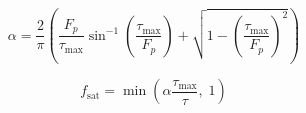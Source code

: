 \begin{equation}
\alpha = \frac{2}{\pi}\left( \frac{F_p}{\tau_{\max}}\sin^{-1}\left(\frac{\tau_{\max}}{F_p}\right) + \sqrt{1-\left(\frac{\tau_{\max}}{F_p}\right)^2} \right)
\end{equation}

\begin{equation}
f_{\mathrm{sat}} = \min\left(\alpha\frac{\tau_{\max}}{\tau},\;1\right)
\end{equation}
